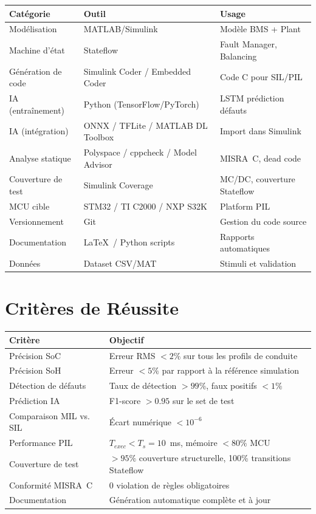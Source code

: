 \documentclass[a4paper,12pt]{article}
\begin{document}
\begin{center}
\small
\begin{tabular}{lll}
\toprule
\textbf{Catégorie} & \textbf{Outil} & \textbf{Usage} \\
\midrule
Modélisation & MATLAB/Simulink & Modèle BMS + Plant \\
Machine d'état & Stateflow & Fault Manager, Balancing \\
Génération de code & Simulink Coder / Embedded Coder & Code C pour SIL/PIL \\
IA (entraînement) & Python (TensorFlow/PyTorch) & LSTM prédiction défauts \\
IA (intégration) & ONNX / TFLite / MATLAB DL Toolbox & Import dans Simulink \\
Analyse statique & Polyspace / cppcheck / Model Advisor & MISRA~C, dead code \\
Couverture de test & Simulink Coverage & MC/DC, couverture Stateflow \\
MCU cible & STM32 / TI C2000 / NXP S32K & Platform PIL \\
Versionnement & Git & Gestion du code source \\
Documentation & \LaTeX\ / Python scripts & Rapports automatiques \\
Données & Dataset CSV/MAT & Stimuli et validation \\
\bottomrule
\end{tabular}
\end{center}

\newpage
\section{Critères de Réussite}

\begin{center}
\begin{tabular}{p{5cm}p{7cm}}
\toprule
\textbf{Critère} & \textbf{Objectif} \\
\midrule
Précision SoC & Erreur RMS $<2\%$ sur tous les profils de conduite \\
Précision SoH & Erreur $<5\%$ par rapport à la référence simulation \\
Détection de défauts & Taux de détection $>99\%$, faux positifs $<1\%$ \\
Prédiction IA & F1-score $>0.95$ sur le set de test \\
Comparaison MIL vs. SIL & Écart numérique $<10^{-6}$ \\
Performance PIL & $T_{exec} < T_s = 10$~ms, mémoire $<80\%$ MCU \\
Couverture de test & $>95\%$ couverture structurelle, 100\% transitions Stateflow \\
Conformité MISRA~C & 0 violation de règles obligatoires \\
Documentation & Génération automatique complète et à jour \\
\bottomrule
\end{tabular}
\end{center}
\end{document}
